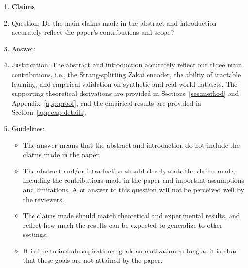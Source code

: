 \documentclass{article}
\begin{document}
\begin{enumerate}

\item {\bf Claims}
    \item[] Question: Do the main claims made in the abstract and introduction accurately reflect the paper's contributions and scope?
    \item[] Answer: \answerYes{} %
    \item[] Justification: The abstract and introduction accurately reflect our three main contributions, i.e., the Strang-splitting Zakai encoder, the ability of tractable learning, and empirical validation on synthetic and real-world datasets. The supporting theoretical derivations are provided in Sections~\ref{sec:method} and Appendix~\ref{app:proof}, and the empirical results are provided in Section~\ref{app:exp-details}.
    \item[] Guidelines:
    \begin{itemize}
        \item The answer \answerNA{} means that the abstract and introduction do not include the claims made in the paper.
        \item The abstract and/or introduction should clearly state the claims made, including the contributions made in the paper and important assumptions and limitations. A \answerNo{} or \answerNA{} answer to this question will not be perceived well by the reviewers. 
        \item The claims made should match theoretical and experimental results, and reflect how much the results can be expected to generalize to other settings. 
        \item It is fine to include aspirational goals as motivation as long as it is clear that these goals are not attained by the paper. 
    \end{itemize}


\end{enumerate}
\end{document}
